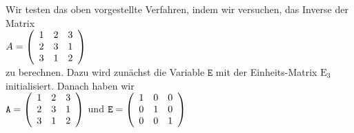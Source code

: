 \example
Wir testen das oben vorgestellte Verfahren, indem wir versuchen, das Inverse der Matrix
\\[0.2cm]
\hspace*{1.3cm}
$A = \left(
  \begin{array}[c]{lll}
    1 & 2 & 3     \\
    2 & 3 & 1     \\
    3 & 1 & 2            
  \end{array}\right)
$
\\[0.2cm]
zu berechnen.  Dazu wird zun\"{a}chst die Variable $\mathtt{E}$ mit der Einheits-Matrix $\mathrm{E}_3$
initialisiert.  Danach haben wir
\\[0.2cm]
\hspace*{1.3cm}
$\mathtt{A} = \left(
  \begin{array}[c]{lll}
    1 & 2 & 3     \\
    2 & 3 & 1     \\
    3 & 1 & 2            
  \end{array}\right)
$
\quad und \quad
$\mathtt{E} = \left(
  \begin{array}[c]{lll}
    1 & 0 & 0     \\
    0 & 1 & 0     \\
    0 & 0 & 1            
  \end{array}\right)
$
 \\[0.2cm]
